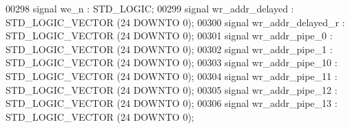 \begin{DoxyCode}
00298                 \textcolor{keywordflow}{signal} \textcolor{vhdlchar}{we_n} \textcolor{vhdlchar}{:}  \textcolor{comment}{STD\_LOGIC};
00299                 \textcolor{keywordflow}{signal} \textcolor{vhdlchar}{wr_addr_delayed} \textcolor{vhdlchar}{:}  \textcolor{comment}{STD\_LOGIC\_VECTOR} \textcolor{vhdlchar}{(}\textcolor{vhdllogic}{}\textcolor{vhdllogic}{24} \textcolor{keywordflow}{DOWNTO} \textcolor{vhdllogic}{}\textcolor{vhdllogic}{0}\textcolor{vhdlchar}{)};
00300                 \textcolor{keywordflow}{signal} \textcolor{vhdlchar}{wr_addr_delayed_r} \textcolor{vhdlchar}{:}  \textcolor{comment}{STD\_LOGIC\_VECTOR} \textcolor{vhdlchar}{(}\textcolor{vhdllogic}{}\textcolor{vhdllogic}{24} \textcolor{keywordflow}{DOWNTO} \textcolor{vhdllogic}{}\textcolor{vhdllogic}{0}\textcolor{vhdlchar}{)};
00301                 \textcolor{keywordflow}{signal} \textcolor{vhdlchar}{wr_addr_pipe_0} \textcolor{vhdlchar}{:}  \textcolor{comment}{STD\_LOGIC\_VECTOR} \textcolor{vhdlchar}{(}\textcolor{vhdllogic}{}\textcolor{vhdllogic}{24} \textcolor{keywordflow}{DOWNTO} \textcolor{vhdllogic}{}\textcolor{vhdllogic}{0}\textcolor{vhdlchar}{)};
00302                 \textcolor{keywordflow}{signal} \textcolor{vhdlchar}{wr_addr_pipe_1} \textcolor{vhdlchar}{:}  \textcolor{comment}{STD\_LOGIC\_VECTOR} \textcolor{vhdlchar}{(}\textcolor{vhdllogic}{}\textcolor{vhdllogic}{24} \textcolor{keywordflow}{DOWNTO} \textcolor{vhdllogic}{}\textcolor{vhdllogic}{0}\textcolor{vhdlchar}{)};
00303                 \textcolor{keywordflow}{signal} \textcolor{vhdlchar}{wr_addr_pipe_10} \textcolor{vhdlchar}{:}  \textcolor{comment}{STD\_LOGIC\_VECTOR} \textcolor{vhdlchar}{(}\textcolor{vhdllogic}{}\textcolor{vhdllogic}{24} \textcolor{keywordflow}{DOWNTO} \textcolor{vhdllogic}{}\textcolor{vhdllogic}{0}\textcolor{vhdlchar}{)};
00304                 \textcolor{keywordflow}{signal} \textcolor{vhdlchar}{wr_addr_pipe_11} \textcolor{vhdlchar}{:}  \textcolor{comment}{STD\_LOGIC\_VECTOR} \textcolor{vhdlchar}{(}\textcolor{vhdllogic}{}\textcolor{vhdllogic}{24} \textcolor{keywordflow}{DOWNTO} \textcolor{vhdllogic}{}\textcolor{vhdllogic}{0}\textcolor{vhdlchar}{)};
00305                 \textcolor{keywordflow}{signal} \textcolor{vhdlchar}{wr_addr_pipe_12} \textcolor{vhdlchar}{:}  \textcolor{comment}{STD\_LOGIC\_VECTOR} \textcolor{vhdlchar}{(}\textcolor{vhdllogic}{}\textcolor{vhdllogic}{24} \textcolor{keywordflow}{DOWNTO} \textcolor{vhdllogic}{}\textcolor{vhdllogic}{0}\textcolor{vhdlchar}{)};
00306                 \textcolor{keywordflow}{signal} \textcolor{vhdlchar}{wr_addr_pipe_13} \textcolor{vhdlchar}{:}  \textcolor{comment}{STD\_LOGIC\_VECTOR} \textcolor{vhdlchar}{(}\textcolor{vhdllogic}{}\textcolor{vhdllogic}{24} \textcolor{keywordflow}{DOWNTO} \textcolor{vhdllogic}{}\textcolor{vhdllogic}{0}\textcolor{vhdlchar}{)};

\end{DoxyCode}
